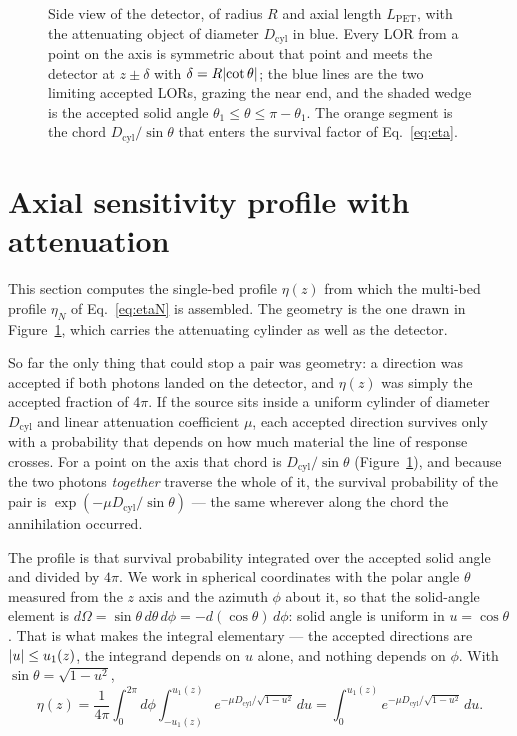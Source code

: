 \documentclass[11pt,a4paper]{article}
\newcommand{\Lpet}{L_{\mathrm{PET}}}
\newcommand{\Dcyl}{D_{\mathrm{cyl}}}
\DeclarePairedDelimiter{\abs}{\lvert}{\rvert}
\begin{document}
\begin{figure}[tbp]
\centering

\caption{Side view of the detector, of radius $R$ and axial length $\Lpet$, with the
attenuating object of diameter $\Dcyl$ in blue. Every LOR from a point on the axis is
symmetric about that point and meets the detector at $z\pm\delta$ with
$\delta=R\abs{\cot\theta}$; the blue lines are the two limiting accepted LORs, grazing the
near end, and the shaded wedge is the accepted solid angle
$\theta_1\le\theta\le\pi-\theta_1$. The orange segment is the chord $\Dcyl/\sin\theta$ that
enters the survival factor of Eq.~\eqref{eq:eta}.}
\label{fig:geom}
\end{figure}

\section{Axial sensitivity profile with attenuation}
\label{sec:profile}


This section computes the single-bed profile $\eta(z)$ from which the multi-bed profile
$\eta_N$ of Eq.~\eqref{eq:etaN} is assembled. The geometry is the one drawn in
Figure~\ref{fig:geom}, which carries the attenuating cylinder as well as the detector.

So far the only thing that could stop a pair was geometry: a direction was accepted if both
photons landed on the detector, and $\eta(z)$ was simply the accepted fraction of $4\pi$. If
the source sits inside a uniform cylinder of diameter $\Dcyl$ and linear attenuation
coefficient $\mu$, each accepted direction survives only with a probability that depends on
how much material the line of response crosses. For a point on the axis that chord is
$\Dcyl/\sin\theta$ (Figure~\ref{fig:geom}), and because the two photons \emph{together}
traverse the whole of it, the survival probability of the pair is
$\exp(-\mu\Dcyl/\sin\theta)$ --- the same wherever along the chord the annihilation
occurred.

The profile is that survival probability integrated over the accepted solid angle and
divided by $4\pi$. We work in spherical coordinates with the polar angle $\theta$ measured
from the $z$ axis and the azimuth $\phi$ about it, so that the solid-angle element is
$d\Omega=\sin\theta\,d\theta\,d\phi=-d(\cos\theta)\,d\phi$: solid angle is uniform in
$u=\cos\theta$. That is what makes the integral elementary --- the accepted directions are
$\abs{u}\le u_1(z)$, the integrand depends on $u$ alone, and nothing depends on $\phi$.
With $\sin\theta=\sqrt{1-u^{2}}$,
\begin{equation}
  \eta(z)=\frac{1}{4\pi}\int_0^{2\pi}\!\!d\phi\int_{-u_1(z)}^{u_1(z)}\!\!
          e^{-\mu \Dcyl/\sqrt{1-u^{2}}}\,du
        = \int_{0}^{u_1(z)} e^{-\mu \Dcyl/\sqrt{1-u^{2}}}\,du .
  \label{eq:eta}
\end{equation}
\end{document}
